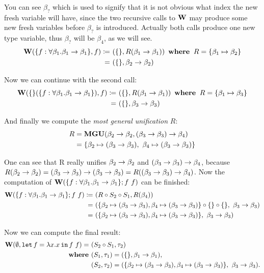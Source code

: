 \documentclass[a4paper,oneside]{memoir}
\begin{document}
You can see $\beta_?$ which is used to signify that it is not obvious what index the new fresh variable will have, since the two recursive calls to $\operatorname{\textbf{W}}$ may produce some new fresh variables before $\beta_?$ is introduced. Actually both calls produce one new type variable, thus $\beta_?$ will be $\beta_4$, as we will see.
\begin{align*}
\operatorname{\textbf{W}}(\{f:\forall \beta_1 . \beta_1 \rightarrow \beta_1 \}, f) \coloneqq ~ & (\{\}, R(\beta_1 \rightarrow \beta_1) ) 
~ \operatorname{\textbf{where~}} R = \{\beta_1 \mapsto \beta_2\} \\
= ~ &  (\{\}, \beta_2 \rightarrow \beta_2)
\end{align*}

Now we can continue with the second call:
\begin{align*}
\operatorname{\textbf{W}}(\{\}(\{f:\forall \beta_1 . \beta_1 \rightarrow \beta_1 \}), f) \coloneqq ~ & (\{\}, R(\beta_1 \rightarrow \beta_1) ) 
~ \operatorname{\textbf{where~}} R = \{\beta_1 \mapsto \beta_3\} \\
= ~ &  (\{\}, \beta_3 \rightarrow \beta_3)
\end{align*}

And finally we compute the \textit{most general unification} $R$:
\begin{align*}
R & = \operatorname{\textbf{MGU}}(\beta_2 \rightarrow \beta_2, (\beta_3 \rightarrow \beta_3) \rightarrow \beta_4 ) \\
  & = \{ \beta_2 \mapsto (\beta_3 \rightarrow \beta_3),~ \beta_4 \mapsto (\beta_3 \rightarrow \beta_3) \}
\end{align*}

One can see that R really unifies $\beta_2 \rightarrow \beta_2$ and $(\beta_3 \rightarrow \beta_3) \rightarrow \beta_4$,
because $R(\beta_2 \rightarrow \beta_2) = (\beta_3 \rightarrow \beta_3) \rightarrow (\beta_3 \rightarrow \beta_3) = R((\beta_3 \rightarrow \beta_3) \rightarrow \beta_4)$. Now the computation of $\operatorname{\textbf{W}}(\{f:\forall \beta_1 . \beta_1 \rightarrow \beta_1 \}; f~f)$ can be finished:
\begin{align*}
\operatorname{\textbf{W}}(\{f:\forall \beta_1 . \beta_1 \rightarrow \beta_1 \}; f~f) 
\coloneqq ~ & (R \circ S_2 \circ S_1, R(\beta_4) ) \\
    = ~ & (\{ \beta_2 \mapsto (\beta_3 \rightarrow \beta_3), \beta_4 \mapsto (\beta_3 \rightarrow \beta_3) \} \circ \{\} \circ \{\},~ \beta_3 \rightarrow \beta_3 )\\ 
    = ~ & (\{ \beta_2 \mapsto (\beta_3 \rightarrow \beta_3), \beta_4 \mapsto (\beta_3 \rightarrow \beta_3) \}, ~ \beta_3 \rightarrow \beta_3 ) 
\end{align*}

Now we can compute the final result:
\begin{align*}
\operatorname{\textbf{W}}(\emptyset, \texttt{let} \, f = \lambda x . x \, \texttt{in} \, f~f) = ~ & (S_2 \circ S_1, \tau_2) \\
\operatorname{\textbf{where~}} & (S_1, \tau_1) = (\{\}, \beta_1 \rightarrow \beta_1 ), \\
       & (S_2, \tau_2) = (\{ \beta_2 \mapsto (\beta_3 \rightarrow \beta_3), \beta_4 \mapsto (\beta_3 \rightarrow \beta_3) \}, ~ \beta_3 \rightarrow \beta_3 ).
\end{align*}
\end{document}

